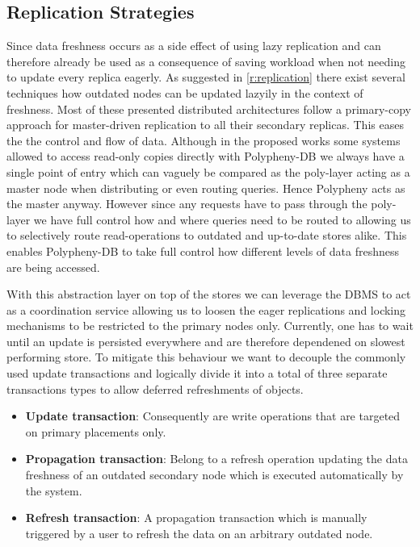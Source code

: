 \subsection{Replication Strategies}
\label{sec:replication_strategy}
Since data freshness occurs as a side effect of using lazy replication and can therefore already
be used as a consequence of saving workload when not needing to update every replica eagerly.
As suggested in \ref{r:replication} there exist several techniques how outdated nodes can be updated lazyily in the context of freshness.
Most of these presented distributed architectures follow a primary-copy approach for master-driven replication to all their secondary replicas.
This eases the the control and flow of data. Although in the proposed works some systems allowed to access read-only copies directly
with Polypheny-DB we always have a single point of entry which can vaguely be compared as the poly-layer acting as a master node
when distributing or even routing queries. Hence Polypheny acts as the master anyway. However since any requests have to pass through the poly-layer
we have full control how and where queries need to be routed to allowing us to selectively route read-operations to outdated and up-to-date stores alike.
This enables Polypheny-DB to take full control how different levels of data freshness are being accessed.

With this abstraction layer on top of the stores we can leverage the DBMS to act as a coordination service allowing us to loosen the eager replications and 
locking mechanisms to be restricted to the primary nodes only. Currently, one has to wait until an update is persisted everywhere and are therefore
dependened on slowest performing store.
To mitigate this behaviour we want to decouple the commonly used update transactions and logically divide it into a total of three separate transactions types
to allow deferred refreshments of objects.
\begin{itemize}
    \item \textbf{Update transaction}: Consequently are write operations that are targeted on primary placements only.
    \item \textbf{Propagation transaction}: Belong to a refresh operation updating the data freshness of an outdated secondary node which is 
    executed automatically by the system.
    \item \textbf{Refresh transaction}: A propagation transaction which is manually triggered by a user to refresh the data on an arbitrary outdated node.
\end{itemize}

